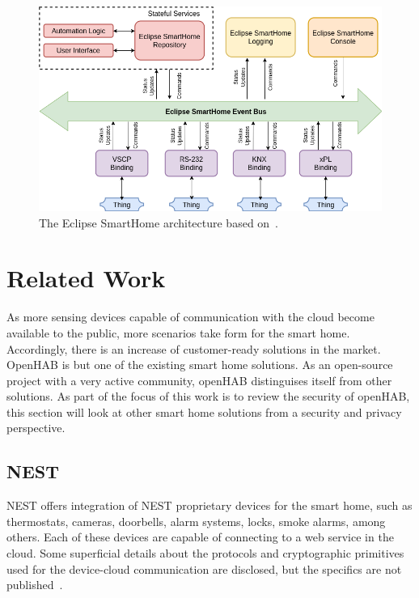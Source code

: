 \documentclass[12pt]{article}
\newcommand{\TODO}{\todo[inline]}
\begin{document}
\begin{figure} [ht] 
\begin{center}
\includegraphics[width=\textwidth]{esh_architecture}
\caption{The Eclipse SmartHome architecture based on~\cite{esh_02}.}
\label{fig:esh_architecture}
\end{center}
\end{figure}

\clearpage
\section{Related Work}
\label{sec:related}
\TODO{SUMMARY}
As more sensing devices capable of communication with the cloud become available to the public, more scenarios take form for the smart home. Accordingly, there is an increase of customer-ready solutions in the market. OpenHAB is but one of the existing smart home solutions. As an open-source project with a very active community, openHAB distinguises itself from other solutions. As part of the focus of this work is to review the security of openHAB, this section will look at other smart home solutions from a security and privacy perspective. 

\subsection{NEST}
NEST offers integration of NEST proprietary devices for the smart home, such as thermostats, cameras, doorbells, alarm systems, locks, smoke alarms, among others. Each of these devices are capable of connecting to a web service in the cloud. Some superficial details about the protocols and cryptographic primitives used for the device-cloud communication are disclosed, but the specifics are not published~\cite{related_01}.
\end{document}
